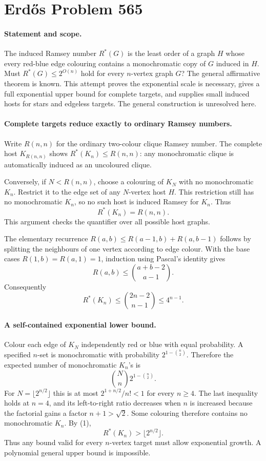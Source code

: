 \section*{Erd\H{o}s Problem 565}

\paragraph{Statement and scope.}
The induced Ramsey number \(R^*(G)\) is the least order of a graph
\(H\) whose every red-blue edge colouring contains a monochromatic
copy of \(G\) induced in \(H\). Must \(R^*(G)\leq2^{O(n)}\)
hold for every \(n\)-vertex graph \(G\)?
The general affirmative theorem is known. This attempt proves the
exponential scale is necessary, gives a full exponential upper bound
for complete targets, and supplies small induced hosts for stars and
edgeless targets. The general construction is unresolved here.

\paragraph{Complete targets reduce exactly to ordinary Ramsey numbers.}
Write \(R(n,n)\) for the ordinary two-colour clique Ramsey number.
The complete host \(K_{R(n,n)}\) shows
\(R^*(K_n)\leq R(n,n)\): any monochromatic clique is automatically
induced as an uncoloured clique.

Conversely, if \(N<R(n,n)\), choose a colouring of \(K_N\) with
no monochromatic \(K_n\). Restrict it to the edge set of any
\(N\)-vertex host \(H\). This restriction still has no monochromatic
\(K_n\), so no such host is induced Ramsey for \(K_n\). Thus
\[
 R^*(K_n)=R(n,n). \tag{1}
\]
This argument checks the quantifier over all possible host graphs.

The elementary recurrence
\(R(a,b)\leq R(a-1,b)+R(a,b-1)\) follows by splitting the
neighbours of one vertex according to edge colour.
With the base cases \(R(1,b)=R(a,1)=1\), induction using Pascal's
identity gives
\[
 R(a,b)\leq\binom{a+b-2}{a-1}.
\]
Consequently
\[
 R^*(K_n)\leq\binom{2n-2}{n-1}\leq4^{n-1}. \tag{2}
\]

\paragraph{A self-contained exponential lower bound.}
Colour each edge of \(K_N\) independently red or blue with equal
probability. A specified \(n\)-set is monochromatic with probability
\(2^{1-\binom n2}\). Therefore the expected number of monochromatic
\(K_n\)'s is
\[
 \binom Nn2^{1-\binom n2}.
\]
For \(N=\lfloor2^{n/2}\rfloor\) this is at most
\(2^{1+n/2}/n!<1\) for every \(n\geq4\).
The last inequality holds at \(n=4\), and its left-to-right ratio
decreases when \(n\) is increased because the factorial gains a
factor \(n+1>\sqrt2\).
Some colouring therefore contains no monochromatic \(K_n\).
By (1),
\[
 R^*(K_n)>\lfloor2^{n/2}\rfloor. \tag{3}
\]
Thus any bound valid for every \(n\)-vertex target must allow
exponential growth. A polynomial general upper bound is impossible.

